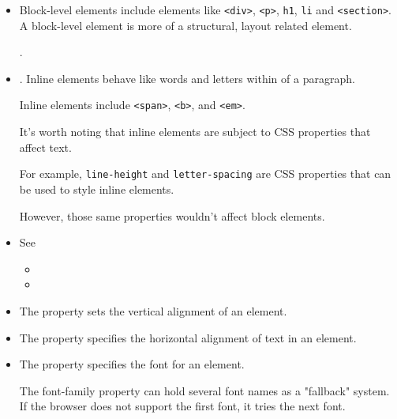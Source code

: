 \begin{itemize}
\item
Block-level elements include elements like \verb|<div>|, \verb|<p>|, \verb|h1|, \verb|li|
and \verb|<section>|.
A block-level element is more of a structural, layout related element.

.
\item
{}.
Inline elements behave like words and letters within of a paragraph.

Inline elements include \verb|<span>|, \verb|<b>|, and \verb|<em>|.

It's worth noting that inline elements are subject to CSS properties that affect text. 

For example, \verb|line-height| and \verb|letter-spacing| are CSS properties that can be used to style inline elements.

However, those same properties wouldn't affect block elements.

\item
See 
\begin{itemize}
\item
{}
\item
{}
\end{itemize}
\end{itemize}

\begin{itemize}
\item
The 
property sets the vertical alignment of an element.
\item
The 
property specifies the horizontal alignment of text in an element.
\item
The 
property specifies the font for an element.

The font-family property can hold several font names as a "fallback" system. 
If the browser does not support the first font, it tries the next font.
\end{itemize}


